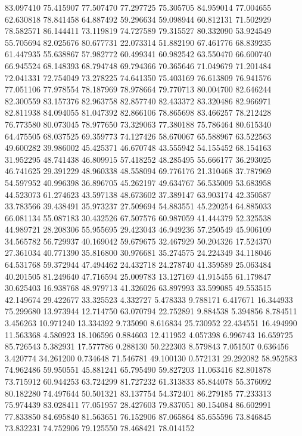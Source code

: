 83.097410
75.415907
77.507470
77.297725
75.305705
84.959014
77.004655
62.630818
78.841458
64.887492
59.296634
59.098944
60.812131
71.502929
78.582571
86.144411
73.119819
74.727589
79.315527
80.332090
53.924549
55.705694
82.025676
80.677731
22.073314
51.882190
67.461776
68.839235
61.447935
55.638867
57.982772
60.499341
60.982542
63.550470
66.600740
66.945524
68.148393
68.794748
69.794366
70.365646
71.049679
71.201484
72.041331
72.754049
73.278225
74.641350
75.403169
76.613809
76.941576
77.051106
77.978554
78.187969
78.978664
79.770713
80.004700
82.646244
82.300559
83.157376
82.963758
82.857740
82.433372
83.320486
82.966971
82.811938
84.094055
81.047392
82.866106
78.865698
83.466257
78.212428
76.773580
80.073045
78.977650
73.329063
77.380188
75.786464
80.615340
64.475505
68.037525
69.359773
74.127426
58.670067
65.588967
63.522563
49.600282
39.986002
45.425371
46.670748
43.555942
54.155452
68.154163
31.952295
48.741438
46.809915
57.418252
48.285495
55.666177
36.293025
46.741625
29.391229
48.960338
48.558094
69.776176
21.310468
37.787969
54.597952
40.996398
36.896705
45.262197
49.634767
56.535009
53.683958
44.523073
61.274623
43.597138
48.673602
37.389147
63.903174
42.350587
33.783566
39.438491
35.973237
27.509694
54.883551
45.220254
64.885033
66.081134
55.087183
30.432526
67.507576
60.987059
41.444379
52.325538
44.989721
28.208306
55.955695
29.423043
46.949236
57.250549
45.906109
34.565782
56.729937
40.169042
59.679675
32.467929
50.204326
17.524370
27.361034
40.771390
35.816800
30.976681
35.274575
24.224349
34.118046
64.531768
59.372944
47.494462
24.432718
24.278740
41.359589
25.063484
40.201505
81.249640
47.716594
25.009783
13.127169
41.915455
61.179847
30.625403
16.938768
48.979713
41.326026
63.897993
33.599085
49.553515
42.149674
29.422677
33.325523
4.332727
5.478333
9.788171
6.417671
16.344933
75.299680
13.973944
12.714750
63.070794
22.752891
9.884538
5.394856
8.784511
3.456263
10.971240
13.334392
9.735090
8.616834
25.730952
22.434551
16.494990
11.563368
4.580923
18.106596
0.884603
12.411952
4.057398
6.996743
16.659725
85.726543
5.382931
17.577786
0.288130
50.222303
8.579843
7.051507
0.636456
3.420774
34.261200
0.734648
71.546781
49.100130
0.572131
29.292082
58.952583
74.962486
59.950551
45.881241
65.795490
59.827203
11.063416
82.801878
73.715912
60.944253
63.724299
81.727232
61.313833
85.844078
55.376092
80.182280
74.497644
50.501321
83.137754
54.372401
86.279185
77.233313
75.974439
83.028411
77.051957
28.427603
79.837051
80.154084
86.602991
77.833850
84.695840
81.563651
76.152906
87.065864
85.655596
73.846845
73.832231
74.752906
79.125550
78.468421
78.014152
